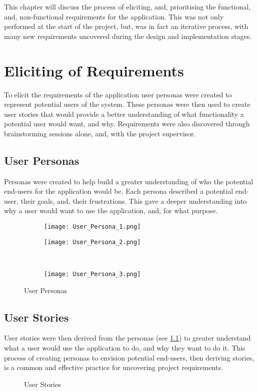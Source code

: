 This chapter will discuss the process of eliciting, and, prioritising the functional, and, non-functional requirements for the application. This was not only performed at the start of the project, but, was in fact an iterative process, with many new requirements uncovered during the design and implementation stages.
\section{Eliciting of Requirements}
To elicit the requirements of the application user personas were created to represent potential users of the system. These personas were then used to create user stories that would provide a better understanding of what functionality a potential user would want, and why. Requirements were also discovered through brainstorming sessions alone, and, with the project supervisor.
\subsection{User Personas} \label{personas}
Personas were created to help build a greater understanding of who the potential end-users for the application would be. Each persona described a potential end-user, their goals, and, their frustrations. This gave a deeper understanding into why a user would want to use the application, and, for what purpose.
\begin{figure}[!htbp]
    \centering
    \begin{subfigure}[b]{0.44\textwidth}
        \texttt{[image: User\_Persona\_1.png]}
    \end{subfigure}
    \hspace{0.5em}
    \begin{subfigure}[b]{0.44\textwidth}
        \texttt{[image: User\_Persona\_2.png]}
    \end{subfigure}
    \\[0.5ex]
    \begin{subfigure}[b]{0.44\textwidth}
        \texttt{[image: User\_Persona\_3.png]}
    \end{subfigure}
    \caption{User Personas}
    \label{fig:personas}
\end{figure}
\FloatBarrier
\subsection{User Stories}
User stories were then derived from the personas (see \ref{personas}) to greater understand what a user would use the application to do, and why they want to do it. This process of creating personas to envision potential end-users, then deriving stories, is a common and effective practice for uncovering project requirements. 
\begin{figure}[!htbp]
    \centering
    \begin{subfigure}[b]{0.90\textwidth}
    \end{subfigure}
    \caption{User Stories}
    \label{fig:stories}
\end{figure}
\FloatBarrier
